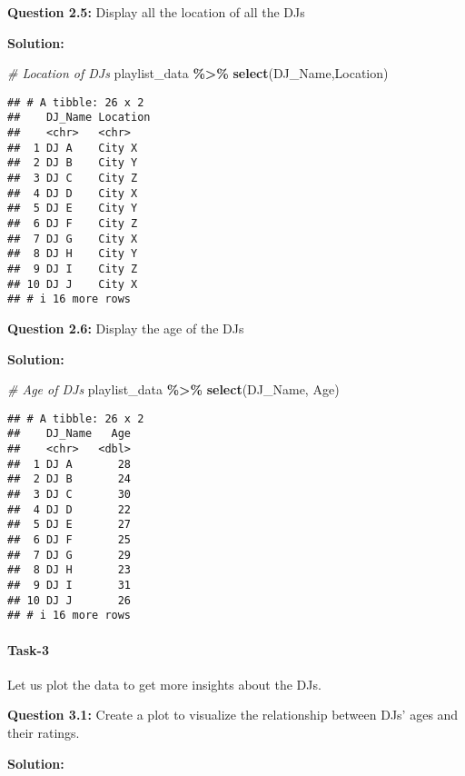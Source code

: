 \documentclass[
]{article}
\newenvironment{Shaded}{\begin{snugshade}}{\end{snugshade}}
\newcommand{\CommentTok}[1]{\textcolor[rgb]{0.56,0.35,0.01}{\textit{#1}}}
\newcommand{\FunctionTok}[1]{\textcolor[rgb]{0.13,0.29,0.53}{\textbf{#1}}}
\newcommand{\NormalTok}[1]{#1}
\newcommand{\SpecialCharTok}[1]{\textcolor[rgb]{0.81,0.36,0.00}{\textbf{#1}}}
\begin{document}
\textbf{Question 2.5:} Display all the location of all the DJs

\textbf{Solution:}

\begin{Shaded}
\begin{Highlighting}[]
\CommentTok{\# Location of DJs}
\NormalTok{playlist\_data }\SpecialCharTok{\%\textgreater{}\%} \FunctionTok{select}\NormalTok{(DJ\_Name,Location)}
\end{Highlighting}
\end{Shaded}

\begin{verbatim}
## # A tibble: 26 x 2
##    DJ_Name Location
##    <chr>   <chr>   
##  1 DJ A    City X  
##  2 DJ B    City Y  
##  3 DJ C    City Z  
##  4 DJ D    City X  
##  5 DJ E    City Y  
##  6 DJ F    City Z  
##  7 DJ G    City X  
##  8 DJ H    City Y  
##  9 DJ I    City Z  
## 10 DJ J    City X  
## # i 16 more rows
\end{verbatim}

\textbf{Question 2.6:} Display the age of the DJs

\textbf{Solution:}

\begin{Shaded}
\begin{Highlighting}[]
\CommentTok{\# Age of DJs}
\NormalTok{playlist\_data }\SpecialCharTok{\%\textgreater{}\%} \FunctionTok{select}\NormalTok{(DJ\_Name, Age)}
\end{Highlighting}
\end{Shaded}

\begin{verbatim}
## # A tibble: 26 x 2
##    DJ_Name   Age
##    <chr>   <dbl>
##  1 DJ A       28
##  2 DJ B       24
##  3 DJ C       30
##  4 DJ D       22
##  5 DJ E       27
##  6 DJ F       25
##  7 DJ G       29
##  8 DJ H       23
##  9 DJ I       31
## 10 DJ J       26
## # i 16 more rows
\end{verbatim}

\hypertarget{task-3}{%
\paragraph{Task-3}\label{task-3}}

Let us plot the data to get more insights about the DJs.

\textbf{Question 3.1:} Create a plot to visualize the relationship
between DJs' ages and their ratings.

\textbf{Solution:}
\end{document}
